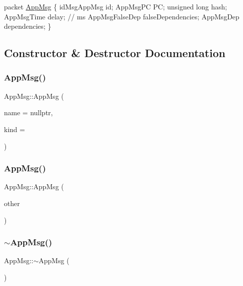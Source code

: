 \begin{DoxyPre}
packet \hyperlink{class_app_msg}{AppMsg}
\{
    idMsgAppMsg id;
    AppMsgPC PC;
    unsigned long hash;
    AppMsgTime delay; // ms 
    AppMsgFalseDep falseDependencies;
    AppMsgDep dependencies;
\}
\end{DoxyPre}
 

\subsection{Constructor \& Destructor Documentation}
\mbox{\label{class_app_msg_abcde1b0a82cb815e59b04ba891f8d1a0}} 
\subsubsection{\texorpdfstring{App\+Msg()}{AppMsg()}\hspace{0.1cm}{\footnotesize\ttfamily [1/2]}}
{\footnotesize\ttfamily App\+Msg\+::\+App\+Msg (\begin{DoxyParamCaption}\item[{const char $\ast$}]{name = {\ttfamily nullptr},  }\item[{short}]{kind = {} }\end{DoxyParamCaption})}

\mbox{\label{class_app_msg_a1b1df77f37c0aba71d69dd65b963c5d5}} 
\subsubsection{\texorpdfstring{App\+Msg()}{AppMsg()}\hspace{0.1cm}{\footnotesize\ttfamily [2/2]}}
{\footnotesize\ttfamily App\+Msg\+::\+App\+Msg (\begin{DoxyParamCaption}\item[{const \hyperlink{class_app_msg}{App\+Msg} \&}]{other }\end{DoxyParamCaption})}

\mbox{\label{class_app_msg_ac15790acabb2755dd83d1d29f57e498c}} 
\subsubsection{\texorpdfstring{$\sim$\+App\+Msg()}{~AppMsg()}}
{\footnotesize\ttfamily App\+Msg\+::$\sim$\+App\+Msg (\begin{DoxyParamCaption}{ }\end{DoxyParamCaption})\hspace{0.3cm}{\ttfamily [virtual]}}



